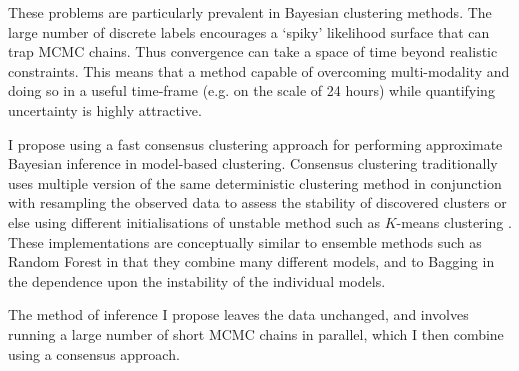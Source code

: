 \documentclass[12pt]{article} %
\begin{document}
	
	
	These problems are particularly prevalent in Bayesian clustering methods. The large number of discrete labels encourages a `spiky' likelihood surface that can trap MCMC chains. Thus convergence can take a space of time beyond realistic constraints. This means that a method capable of overcoming multi-modality and doing so in a useful time-frame (e.g. on the scale of 24 hours) while quantifying uncertainty is highly attractive. 
	
	I propose using a fast consensus clustering approach for performing approximate Bayesian inference in model-based clustering.  Consensus clustering traditionally uses multiple version of the same deterministic clustering method in conjunction with resampling the observed data to assess the stability of discovered clusters or else using different initialisations of unstable method such as $K$-means clustering \citep{MontiConsensusClusteringResamplingBased}. These implementations are conceptually similar to ensemble methods such as Random Forest \citep{BreimanRandomForests2001} in that they combine many different models, and to Bagging \citep{BreimanBaggingpredictors1996} in the dependence upon the instability of the individual models.
	
	The method of inference I propose leaves the data unchanged, and involves running a large number of short MCMC chains in parallel, which I then combine using a consensus approach. 
	
\end{document}

